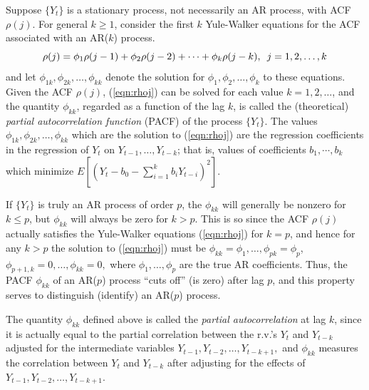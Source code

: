 Suppose $\{Y_t\}$ is a stationary process, not necessarily an AR process, with ACF $\rho(j)$. For general $k \geq 1$, consider the first $k$ Yule-Walker equations for the ACF associated with an AR($k$) process.
	\begin{equation}\label{eqn:rhoj}
	\rho(j) = \phi_1\rho(j-1) + \phi_2\rho(j-2) + \cdots + \phi_k\rho(j-k),\enskip j = 1, 2,\ldots, k
	\end{equation}
and let $\phi_{1k},\phi_{2k},\ldots,\phi_{kk}$ denote the solution for $\phi_1,\phi_2,\ldots,\phi_k$ to these equations. Given the ACF $\rho(j)$, (\ref{eqn:rhoj}) can be solved for each value $k= 1,2,\ldots$, and the quantity $\phi_{kk}$, regarded as a function of the lag $k$, is called the (theoretical) \textit{partial autocorrelation function} (PACF) of the process $\{Y_t\}$. The values $\phi_{1k}, \phi_{2k},\ldots, \phi_{kk}$ which are the solution to (\ref{eqn:rhoj}) are the regression coefficients in the regression of $Y_t$ on $Y_{t-1},\ldots,Y_{t-k}$; that is, values of coefficients $b_1,\cdots,b_k$ which minimize $E[(Y_t - b_0 - \sum_{i=1}^k b_iY_{t-i})^2]$.


If $\{Y_t\}$ is truly an AR process of order $p$, the $\phi_{kk}$ will generally be nonzero for $k \leq p$, but $\phi_{kk}$ will always be zero for $k>p$. This is so since the ACF $\rho(j)$ actually satisfies the Yule-Walker equations (\ref{eqn:rhoj}) for $k=p$, and hence for any $k>p$ the solution to (\ref{eqn:rhoj}) must be $\phi_{kk}= \phi_1,\ldots, \phi_{pk}= \phi_p$, $\phi_{p+1,k} = 0,\ldots,\phi_{kk} = 0,$ where $\phi_1,\ldots,\phi_p$ are the true AR coefficients. Thus, the PACF $\phi_{kk}$ of an AR($p$) process ``cuts off'' (is zero) after lag $p$, and this property serves to distinguish (identify) an AR($p$) process.


The quantity $\phi_{kk}$ defined above is called the \textit{partial autocorrelation} at lag $k$, since it is actually equal to the partial correlation between the r.v.'s $Y_t$ and $Y_{t-k}$ adjusted for the intermediate variables $Y_{t-1}, Y_{t-2},\ldots,Y_{t-k+1},$ and $\phi_{kk}$ measures the correlation between $Y_t$ and $Y_{t-k}$ after adjusting for the effects of $Y_{t-1}, Y_{t-2},\ldots,Y_{t-k+1}$.


